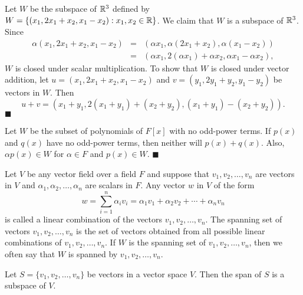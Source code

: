 \vspace{2 ex}
 
  
Let $W$ be the subspace of ${\Bbb R}^3$ defined by $W = \{ (x_1, 2 x_1
+ x_2, x_1 - x_2) : x_1, x_2 \in {\Bbb R} \}$. We claim that $W$ is a 
subspace of ${\Bbb R}^3$.  Since 
\begin{eqnarray*}
\alpha (x_1, 2 x_1 + x_2, x_1 - x_2) 
& = & (\alpha x_1, \alpha(2 x_1 + x_2), \alpha( x_1 - x_2)) \\
& = & (\alpha x_1, 2(\alpha x_1) + \alpha x_2, \alpha x_1 -\alpha x_2),
\end{eqnarray*}
$W$ is closed under scalar multiplication. To show that $W$ is closed
under vector addition, let $u = (x_1, 2 x_1 + x_2, x_1 - x_2)$ and $v
= (y_1, 2 y_1 + y_2, y_1 - y_2)$ be vectors in $W$. Then
\[
u + v = 
(x_1 + y_1, 2( x_1 + y_1) +( x_2 + y_2), (x_1 + y_1) - (x_2+ y_2)).
\]
\hspace{\fill} $\blacksquare$
 
 
\vspace{2 ex}
 
 
Let $W$ be the subset of polynomials of $F[x]$ with no odd-power
terms. If $p(x)$ and $q(x)$ have no odd-power terms, then neither will 
$p(x) + q(x)$.  Also, $\alpha p(x) \in W$ for $\alpha \in F$ and $p(x)
\in W$.
\hspace{\fill} $\blacksquare$
  

\vspace{2 ex}

 
Let $V$ be any vector field over a field $F$ and suppose that $v_1,
v_2, \ldots, v_n$ are vectors in $V$ and $\alpha_1, \alpha_2, \ldots,
\alpha_n$ are scalars in $F$. Any vector $w$ in $V$ of the form
\[
w = \sum_{i=1}^n \alpha_i v_i = \alpha_1 v_1 + \alpha_2 v_2 + \cdots + \alpha_n v_n
\]
is called a {\bfi linear combination\/} of the
vectors $v_1, v_2, \ldots, v_n$. The {\bfi spanning
set\/} of vectors $v_1, v_2, \ldots, v_n$ is the
set of vectors obtained from all possible linear combinations of
$v_1, v_2, \ldots, v_n$. If $W$ is the spanning set of $v_1, v_2,
\ldots, v_n$, then we often say that $W$ is {\bfi spanned\/} by $v_1,
v_2, \ldots, v_n$. 
 
 
\begin{proposition}
Let $S= \{v_1, v_2, \ldots, v_n \}$ be vectors in a vector space $V$.
Then the span of $S$ is a subspace of $V$. 
\end{proposition}


